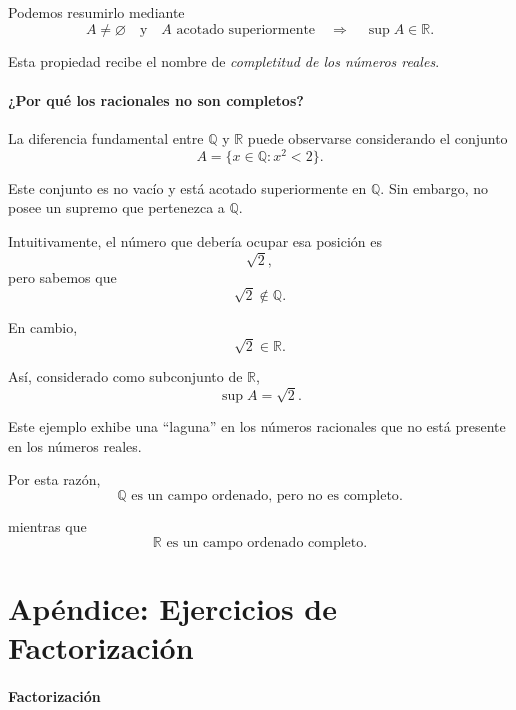 \documentclass[12pt]{article}
\theoremstyle{plain}
\theoremstyle{definition}
\theoremstyle{remark}
\begin{document}
{Podemos resumirlo mediante
\[
\boxed{
A\neq\varnothing
\quad\text{y}\quad
A\text{ acotado superiormente}
\quad\Longrightarrow\quad
\sup A\in\mathbb{R}.
}
\]

Esta propiedad recibe el nombre de \emph{completitud de los números reales}.

\subsection*{¿Por qué los racionales no son completos?}

La diferencia fundamental entre $\mathbb{Q}$ y $\mathbb{R}$ puede observarse considerando el conjunto
\[
A=\{x\in\mathbb{Q}:x^2<2\}.
\]

Este conjunto es no vacío y está acotado superiormente en $\mathbb{Q}$.
Sin embargo, no posee un supremo que pertenezca a $\mathbb{Q}$.

Intuitivamente, el número que debería ocupar esa posición es
\[
\sqrt{2},
\]
pero sabemos que
\[
\sqrt{2}\notin\mathbb{Q}.
\]

En cambio,
\[
\sqrt{2}\in\mathbb{R}.
\]

Así, considerado como subconjunto de $\mathbb{R}$,
\[
\sup A=\sqrt{2}.
\]

Este ejemplo exhibe una ``laguna'' en los números racionales que no está
presente en los números reales.

Por esta razón,
\[
\boxed{\mathbb{Q}\text{ es un campo ordenado, pero no es completo}.}
\]

mientras que
\[
\boxed{\mathbb{R}\text{ es un campo ordenado completo}.}
\]

\part{Ap\'endice: Ejercicios de Factorizaci\'on}
\setcounter{section}{2}

\subsection*{Factorización}

}
\end{document}
